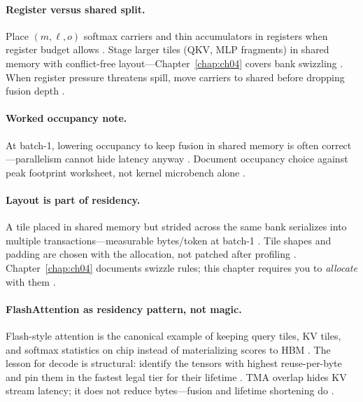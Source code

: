 \paragraph{Register versus shared split.}
Place $(m,\ell,o)$ softmax carriers and thin accumulators in registers when register budget allows \citep{dao2022flashattention,nvidia2022hopper}.
Stage larger tiles (QKV, MLP fragments) in shared memory with conflict-free layout---Chapter~\ref{chap:ch04} covers bank swizzling \citep{semianalysis2024tma,yirage2026}.
When register pressure threatens spill, move carriers to shared before dropping fusion depth \citep{memoryfloor2026,taxbreak2026}.

\paragraph{Worked occupancy note.}
At batch-1, lowering occupancy to keep fusion in shared memory is often correct---parallelism cannot hide latency anyway \citep{taxbreak2026,memoryfloor2026,patel2025llminference}.
Document occupancy choice against peak footprint worksheet, not kernel microbench alone \citep{yirage2026,nvidia2022hopper}.

\paragraph{Layout is part of residency.}
A tile placed in shared memory but strided across the same bank serializes into multiple transactions---measurable bytes/token at batch-1 \citep{semianalysis2024tma,nvidia2022hopper}.
Tile shapes and padding are chosen with the allocation, not patched after profiling \citep{yirage2026,dao2022flashattention}.
Chapter~\ref{chap:ch04} documents swizzle rules; this chapter requires you to \emph{allocate} with them \citep{semianalysis2024tma}.

\paragraph{FlashAttention as residency pattern, not magic.}
Flash-style attention is the canonical example of keeping query tiles, KV tiles, and softmax statistics on chip instead of materializing scores to HBM \citep{dao2022flashattention}.
The lesson for decode is structural: identify the tensors with highest reuse-per-byte and pin them in the fastest legal tier for their lifetime \citep{dlbook,patel2025llminference}.
TMA overlap hides KV stream latency; it does not reduce bytes---fusion and lifetime shortening do \citep{memoryfloor2026,semianalysis2024tma}.

